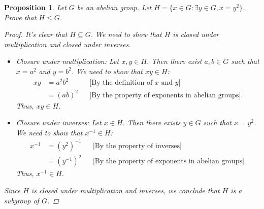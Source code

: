 \documentclass[12pt]{article}
\newtheorem{proposition}{Proposition}
\begin{document}
\begin{proposition}
  Let $G$ be an abelian group. Let $H = \{x \in G : \exists y \in G, x = y^2\}$. Prove that $H \leqslant G$.
  \begin{proof}
    It's clear that $H \subseteq G$. We need to show that $H$ is closed under multiplication and closed under inverses.
    \begin{itemize}
      \item Closure under multiplication: Let $x, y \in H$. Then there exist $a, b \in G$ such that $x = a^2$ and $y = b^2$.
            We need to show that $xy \in H$:
            \begin{align*}
              xy & = a^2b^2 &  & \text{[By the definition of } x \text{ and } y]          \\
                 & = (ab)^2 &  & \text{[By the property of exponents in abelian groups]}.
            \end{align*}
            Thus, $xy \in H$.
      \item Closure under inverses: Let $x \in H$. Then there exists $y \in G$ such that $x = y^2$.
            We need to show that $x^{-1} \in H$:
            \begin{align*}
              x^{-1} & = (y^2)^{-1} &  & \text{[By the property of inverses]}                     \\
                     & = (y^{-1})^2 &  & \text{[By the property of exponents in abelian groups]}.
            \end{align*}
            Thus, $x^{-1} \in H$.
    \end{itemize}
    Since $H$ is closed under multiplication and inverses, we conclude that $H$ is a subgroup of $G$.
  \end{proof}
\end{proposition}
\end{document}
